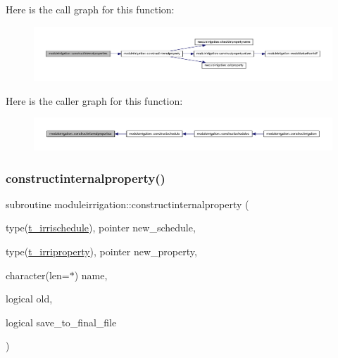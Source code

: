 Here is the call graph for this function\+:\nopagebreak
\begin{figure}[H]
\begin{center}
\leavevmode
\includegraphics[width=350pt]{namespacemoduleirrigation_ab5de3f1600faba7f4c6ae843ce15e5e3_cgraph}
\end{center}
\end{figure}
Here is the caller graph for this function\+:\nopagebreak
\begin{figure}[H]
\begin{center}
\leavevmode
\includegraphics[width=350pt]{namespacemoduleirrigation_ab5de3f1600faba7f4c6ae843ce15e5e3_icgraph}
\end{center}
\end{figure}
\mbox{\label{namespacemoduleirrigation_ae801aa6c2bc91136e80b57fea94668d1}} 
\subsubsection{\texorpdfstring{constructinternalproperty()}{constructinternalproperty()}}
{\footnotesize\ttfamily subroutine moduleirrigation\+::constructinternalproperty (\begin{DoxyParamCaption}\item[{type(\mbox{\hyperlink{structmoduleirrigation_1_1t__irrischedule}{t\+\_\+irrischedule}}), pointer}]{new\+\_\+schedule,  }\item[{type(\mbox{\hyperlink{structmoduleirrigation_1_1t__irriproperty}{t\+\_\+irriproperty}}), pointer}]{new\+\_\+property,  }\item[{character(len=$\ast$)}]{name,  }\item[{logical}]{old,  }\item[{logical}]{save\+\_\+to\+\_\+final\+\_\+file }\end{DoxyParamCaption})\hspace{0.3cm}{\ttfamily [private]}}

